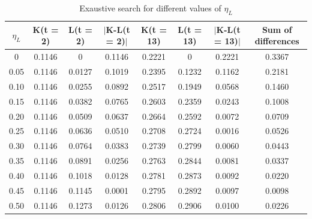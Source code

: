 \documentclass[a4paper]{article}
\begin{document}
\begin{table}[!htpb]
\centering
\begin{adjustbox}{width=1.2\textwidth,center=\textwidth}
\begin{tabular}{c|c|c|c|c|c|c|c}
\textbf{$\eta_{L}$} & \textbf{K(t = 2)} & \textbf{L(t = 2)} & \textbf{$|$K-L(t = 2)$|$} & \textbf{K(t = 13)} & \textbf{L(t = 13)} & \textbf{$|$K-L(t = 13)$|$} & \textbf{Sum of differences} \\ \hline
0                   & 0.1146            & 0                 & 0.1146                    & 0.2221             & 0                  & 0.2221                     & 0.3367                      \\
0.05                & 0.1146            & 0.0127            & 0.1019                    & 0.2395             & 0.1232             & 0.1162                     & 0.2181                      \\
0.10                & 0.1146            & 0.0255            & 0.0892                    & 0.2517             & 0.1949             & 0.0568                     & 0.1460                      \\
0.15                & 0.1146            & 0.0382            & 0.0765                    & 0.2603             & 0.2359             & 0.0243                     & 0.1008                      \\
0.20                & 0.1146            & 0.0509            & 0.0637                    & 0.2664             & 0.2592             & 0.0072                     & 0.0709                      \\
0.25                & 0.1146            & 0.0636            & 0.0510                    & 0.2708             & 0.2724             & 0.0016                     & 0.0526                      \\
0.30                & 0.1146            & 0.0764            & 0.0383                    & 0.2739             & 0.2799             & 0.0060                     & 0.0443                      \\
0.35                & 0.1146            & 0.0891            & 0.0256                    & 0.2763             & 0.2844             & 0.0081                     & 0.0337                      \\
0.40                & 0.1146            & 0.1018            & 0.0128                    & 0.2781             & 0.2873             & 0.0092                     & 0.0220                      \\
0.45                & 0.1146            & 0.1145            & 0.0001                    & 0.2795             & 0.2892             & 0.0097                     & 0.0098                      \\
0.50                & 0.1146            & 0.1273            & 0.0126                    & 0.2806             & 0.2906             & 0.0100                     & 0.0226                     
\end{tabular}
\end{adjustbox}
\caption{Exaustive search for different values of $\eta_{L}$}
\label{tab:exaustive_search}
\end{table}
\end{document}
